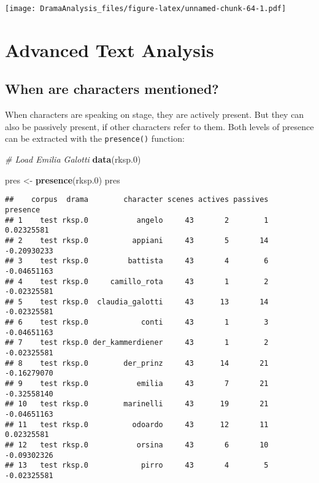 \documentclass[]{book}
\newenvironment{Shaded}{\begin{snugshade}}{\end{snugshade}}
\newcommand{\CommentTok}[1]{\textcolor[rgb]{0.56,0.35,0.01}{\textit{#1}}}
\newcommand{\FloatTok}[1]{\textcolor[rgb]{0.00,0.00,0.81}{#1}}
\newcommand{\KeywordTok}[1]{\textcolor[rgb]{0.13,0.29,0.53}{\textbf{#1}}}
\newcommand{\NormalTok}[1]{#1}
\newcommand{\StringTok}[1]{\textcolor[rgb]{0.31,0.60,0.02}{#1}}
\begin{document}
\texttt{[image: DramaAnalysis\_files/figure-latex/unnamed-chunk-64-1.pdf]}

\hypertarget{advanced-text-analysis}{%
\chapter{Advanced Text Analysis}\label{advanced-text-analysis}}

\hypertarget{when-are-characters-mentioned}{%
\section{When are characters mentioned?}\label{when-are-characters-mentioned}}

When characters are speaking on stage, they are actively present. But they can also be passively present, if other characters refer to them. Both levels of presence can be extracted with the \texttt{presence()} function:

\begin{Shaded}
\begin{Highlighting}[]
\CommentTok{# Load Emilia Galotti}
\KeywordTok{data}\NormalTok{(rksp}\FloatTok{.0}\NormalTok{)}

\NormalTok{pres <-}\StringTok{ }\KeywordTok{presence}\NormalTok{(rksp}\FloatTok{.0}\NormalTok{)}
\NormalTok{pres}
\end{Highlighting}
\end{Shaded}

\begin{verbatim}
##    corpus  drama        character scenes actives passives    presence
## 1    test rksp.0           angelo     43       2        1  0.02325581
## 2    test rksp.0          appiani     43       5       14 -0.20930233
## 3    test rksp.0         battista     43       4        6 -0.04651163
## 4    test rksp.0     camillo_rota     43       1        2 -0.02325581
## 5    test rksp.0  claudia_galotti     43      13       14 -0.02325581
## 6    test rksp.0            conti     43       1        3 -0.04651163
## 7    test rksp.0 der_kammerdiener     43       1        2 -0.02325581
## 8    test rksp.0        der_prinz     43      14       21 -0.16279070
## 9    test rksp.0           emilia     43       7       21 -0.32558140
## 10   test rksp.0        marinelli     43      19       21 -0.04651163
## 11   test rksp.0          odoardo     43      12       11  0.02325581
## 12   test rksp.0           orsina     43       6       10 -0.09302326
## 13   test rksp.0            pirro     43       4        5 -0.02325581
\end{verbatim}
\end{document}
